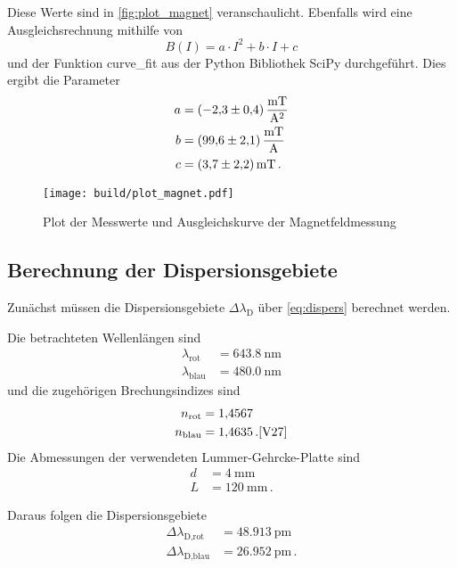 Diese Werte sind in \autoref{fig:plot_magnet} veranschaulicht. 
Ebenfalls wird eine Ausgleichsrechnung mithilfe von
\begin{equation}
    B(I) = a \cdot I^2 + b \cdot I + c
    \label{eq:ausgleich}
\end{equation}
und der Funktion curve\_fit aus der Python Bibliothek SciPy durchgeführt. \cite{scipy}
Dies ergibt die Parameter
\begin{align*}
    a &= \SI{-2.3+-0.4}{\milli\tesla\per\ampere\squared} \\
    b &= \SI{99.6+-2.1}{\milli\tesla\per\ampere} \\
    c &= \SI{3.7+-2.2}{\milli\tesla} \, .
\end{align*}

\begin{figure}
    \centering
    \texttt{[image: build/plot\_magnet.pdf]}
    \caption{Plot der Messwerte und Ausgleichskurve der Magnetfeldmessung}
    \label{fig:plot_magnet}
\end{figure}

\subsection{Berechnung der Dispersionsgebiete}
\label{ssec:Berechnung der Dispersionsgebiete}

Zunächst müssen die Dispersionsgebiete $\Delta\lambda_\text{D}$ über \autoref{eq:dispers} berechnet werden.

Die betrachteten Wellenlängen sind
\begin{align*}
    \lambda_\text{rot} &= \SI{643.8}{\nano\meter} \\
    \lambda_\text{blau} &= \SI{480.0}{\nano\meter}
\end{align*}
und die zugehörigen Brechungsindizes sind
\begin{align*}
    n_\text{rot} &= \num{1.4567} \\
    n_\text{blau} &= \num{1.4635} \, . \text{\cite{V27}}
\end{align*}
Die Abmessungen der verwendeten Lummer-Gehrcke-Platte sind 
\begin{align*}
    d &= \SI{4}{\milli\meter} \\
    L &= \SI{120}{\milli\meter} \, .
\end{align*}

Daraus folgen die Dispersionsgebiete
\begin{align*}
    \Delta\lambda_\text{D,rot} &= \SI{48.913}{\pico\meter} \\
    \Delta\lambda_\text{D,blau} &= \SI{26.952}{\pico\meter} \, .
\end{align*}

